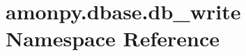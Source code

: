 \hypertarget{namespaceamonpy_1_1dbase_1_1db__write}{\section{amonpy.\-dbase.\-db\-\_\-write Namespace Reference}
\label{namespaceamonpy_1_1dbase_1_1db__write}
}
